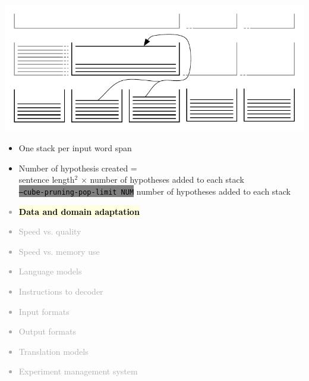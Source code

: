 \documentclass[landscape]{uedslides2C}
\newcommand{\currenttopic}[1]{\colorbox{lightyellow}{\textcolor{black}{\bf #1}}}
\newcommand{\littlecode}[1]{\colorbox{gray}{\textcolor{black}{\small \tt #1}}}
\begin{document}

\begin{center} 
\includegraphics[scale=1.5]{chart-stacks.pdf}
\end{center}
\vspace{-5mm}
\begin{itemize} \itemsep -2mm
\item One stack per input word span
\item Number of hypothesis created = \\
sentence length$^2$ $\times$  number of hypotheses added to each stack\\
\littlecode{--cube-pruning-pop-limit NUM} number of hypotheses added to each stack
\end{itemize}


\vspace{-5mm}
\textcolor{darkgrey}{
\begin{itemize} \itemsep -1mm
\item \currenttopic{Data and domain adaptation}
\item Speed vs. quality
\item Speed vs. memory use
\item Language models
\item Instructions to decoder
\item Input formats
\item Output formats
\item Translation models
\item Experiment management system
\end{itemize}
}

\end{document}
